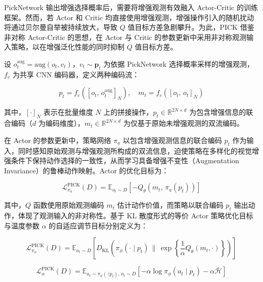 PickNetwork 输出增强选择概率后，需要将增强观测有效融入 Actor-Critic 的训练框架。然而，若 Actor 和 Critic 均直接使用增强观测，增强操作引入的随机扰动将通过贝尔曼自举被持续放大，导致 $Q$ 值目标方差急剧攀升。为此，PICK 借鉴非对称 Actor-Critic 的思想\cite{pinto2017asymmetric}，在 Actor 与 Critic 的参数更新中采用非对称观测输入策略，以在增强泛化性能的同时抑制 $Q$ 值目标方差。

设 $o_t^{\text{aug}} = \text{aug}(o_t, v_t)$，$v_t \sim \mathbf{p}_t$ 为依据 PickNetwork 选择概率采样的增强观测，$f_e$ 为共享 CNN 编码器，定义两种编码流：

\begin{equation}
    p_t = f_e\!\left([o_t,\, o_t^{\text{aug}}]_N\right), \quad m_t = f_e\!\left([o_t,\, o_t]_N\right)
\end{equation}

其中，$[\cdot]_N$ 表示在批量维度 $N$ 上的拼接操作，$p_t \in \mathbb{R}^{2N \times d}$ 为包含增强信息的联合编码（$d$ 为编码维度），$m_t \in \mathbb{R}^{2N \times d}$ 为仅基于原始未增强观测的双流编码。

在 Actor 的参数更新中，策略网络 $\pi_a$ 以包含增强观测信息的联合编码 $p_t$ 作为输入，同时感知原始观测与增强观测所构成的双流信息，迫使策略在多样化的视觉增强条件下保持动作选择的一致性，从而学习具备增强不变性（Augmentation Invariance）的鲁棒动作映射。Actor 的优化目标为：

\begin{equation}
    \mathcal{L}_{\pi_a}^{\text{PICK}}(D) = \mathbb{E}_{o_t \sim D}\!\left[ -Q_\theta\!\left( m_t,\, \pi_a(p_t) \right) \right]
    \label{eq:actor_loss}
\end{equation}

其中，$Q$ 函数使用原始观测编码 $m_t$ 估计动作价值，而策略以联合编码 $p_t$ 输出动作，体现了观测输入的非对称性。基于 KL 散度形式的等价 Actor 策略优化目标与温度参数 $\alpha$ 的自适应调节目标分别定义为：

\begin{equation}
    \mathcal{L}_{\pi_\phi}^{\text{PICK}}(D) = \mathbb{E}_{o_t \sim D}\!\left[ D_{\text{KL}}\!\left( \pi_\phi(\cdot \mid p_t) \,\Big\|\, \exp\!\left\{ \frac{1}{\alpha} Q_\theta(m_t, \cdot) \right\} \right) \right]
\end{equation}

\begin{equation}
    \mathcal{L}_\alpha^{\text{PICK}}(D) = \mathbb{E}_{a_t \sim \pi_\phi(\cdot|p_t),\, o_t \sim D}\!\left[ -\alpha \log \pi_\phi(a_t \mid p_t) - \alpha \bar{\mathcal{H}} \right]
\end{equation}

